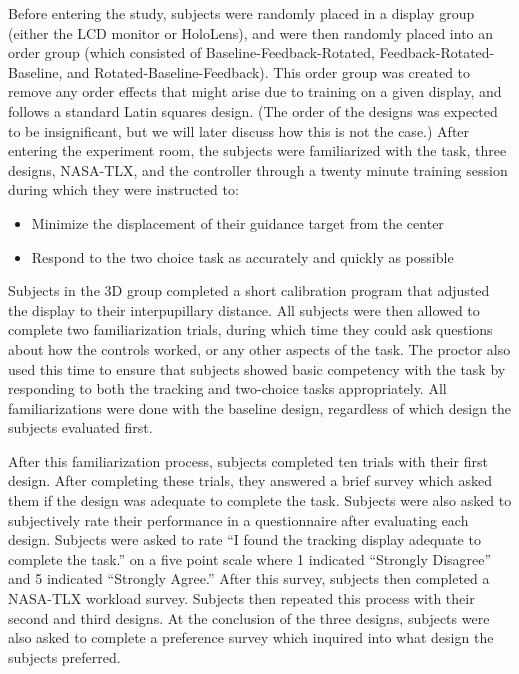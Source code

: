 Before entering the study, subjects were randomly placed in a display group (either the LCD monitor or HoloLens), and were then randomly placed into an order group (which consisted of Baseline-Feedback-Rotated, Feedback-Rotated-Baseline, and Rotated-Baseline-Feedback).
This order group was created to remove any order effects that might arise due to training on a given display, and follows a standard Latin squares design.
(The order of the designs was expected to be insignificant, but we will later discuss how this is not the case.)
After entering the experiment room, the subjects were familiarized with the task, three designs, NASA-TLX, and the controller through a twenty minute training session during which they were instructed to:
\begin{itemize}
    \item Minimize the displacement of their guidance target from the center
    \item Respond to the two choice task as accurately and quickly as possible
\end{itemize}

Subjects in the 3D group completed a short calibration program that adjusted the display to their interpupillary distance.
All subjects were then allowed to complete two familiarization trials, during which time they could ask questions about how the controls worked, or any other aspects of the task.
The proctor also used this time to ensure that subjects showed basic competency with the task by responding to both the tracking and two-choice tasks appropriately.
All familiarizations were done with the baseline design, regardless of which design the subjects evaluated first.

After this familiarization process, subjects completed ten trials with their first design.
After completing these trials, they answered a brief survey which asked them if the design was adequate to complete the task.
Subjects were also asked to subjectively rate their performance in a questionnaire after evaluating each design.
Subjects were asked to rate ``I found the tracking display adequate to complete the task.'' on a five point scale where 1 indicated ``Strongly Disagree'' and 5 indicated ``Strongly Agree.''
After this survey, subjects then completed a NASA-TLX workload survey.
Subjects then repeated this process with their second and third designs.
At the conclusion of the three designs, subjects were also asked to complete a preference survey which inquired into what design the subjects preferred.

